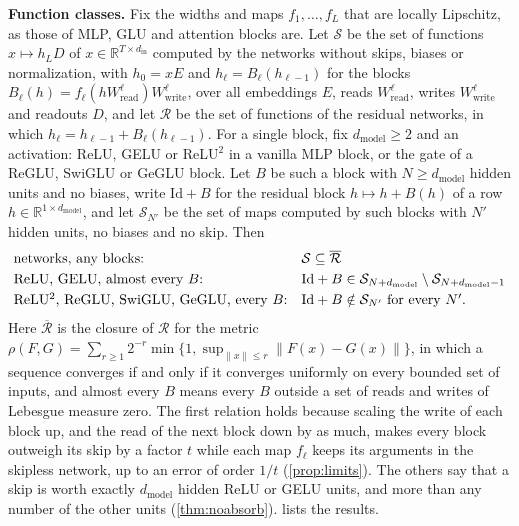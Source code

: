 \documentclass[10pt]{article}
\theoremstyle{definition}
\theoremstyle{remark}
\newcommand{\R}{\mathbb{R}}
\newcommand{\Wread}{W_{\mathrm{read}}}
\newcommand{\Wwrite}{W_{\mathrm{write}}}
\newcommand{\dm}{d_{\mathrm{model}}}
\newcommand{\norm}[1]{\lVert #1\rVert}
\newcommand{\para}[1]{\smallskip\noindent\textbf{#1}\hspace{0.5em}}
\begin{document}
\para{Function classes.} Fix the widths and maps $f_1, \dots, f_L$ that are locally Lipschitz, as those of MLP, GLU and attention blocks are. Let $\mathcal S$ be the set of functions $x \mapsto h_LD$ of $x \in \R^{T\times d_{\mathrm{in}}}$ computed by the networks without skips, biases or normalization, with $h_0 = xE$ and $h_\ell = B_\ell(h_{\ell-1})$ for the blocks $B_\ell(h) = f_\ell(h\Wread^{\ell})\Wwrite^{\ell}$, over all embeddings $E$, reads $\Wread^{\ell}$, writes $\Wwrite^{\ell}$ and readouts $D$, and let $\mathcal R$ be the set of functions of the residual networks, in which $h_\ell = h_{\ell-1} + B_\ell(h_{\ell-1})$. For a single block, fix $\dm \ge 2$ and an activation: ReLU, GELU or ReLU$^2$ in a vanilla MLP block, or the gate of a ReGLU, SwiGLU or GeGLU block. Let $B$ be such a block with $N \ge \dm$ hidden units and no biases, write $\mathrm{Id} + B$ for the residual block $h \mapsto h + B(h)$ of a row $h \in \R^{1\times\dm}$, and let $\mathcal S_{N'}$ be the set of maps computed by such blocks with $N'$ hidden units, no biases and no skip. Then
\begin{equation}\label{eq:classes}
\begin{array}{@{}ll@{}}
\text{networks, any blocks:} & \mathcal S \subseteq \overline{\mathcal R}\\[3pt]
\text{ReLU, GELU, almost every $B$:} & \mathrm{Id} + B \in \mathcal S_{N+\dm} \setminus \mathcal S_{N+\dm-1}\\[3pt]
\text{ReLU$^2$, ReGLU, SwiGLU, GeGLU, every $B$:} & \mathrm{Id} + B \notin \mathcal S_{N'} \text{ for every } N'.
\end{array}
\end{equation}
Here $\overline{\mathcal R}$ is the closure of $\mathcal R$ for the metric $\rho(F, G) = \sum_{r \ge 1} 2^{-r}\min\{1, \sup_{\norm{x} \le r}\norm{F(x) - G(x)}\}$, in which a sequence converges if and only if it converges uniformly on every bounded set of inputs, and almost every $B$ means every $B$ outside a set of reads and writes of Lebesgue measure zero. The first relation holds because scaling the write of each block up, and the read of the next block down by as much, makes every block outweigh its skip by a factor $t$ while each map $f_\ell$ keeps its arguments in the skipless network, up to an error of order $1/t$ (\cref{prop:limits}). The others say that a skip is worth exactly $\dm$ hidden ReLU or GELU units, and more than any number of the other units (\cref{thm:noabsorb}).  lists the results.
\end{document}
